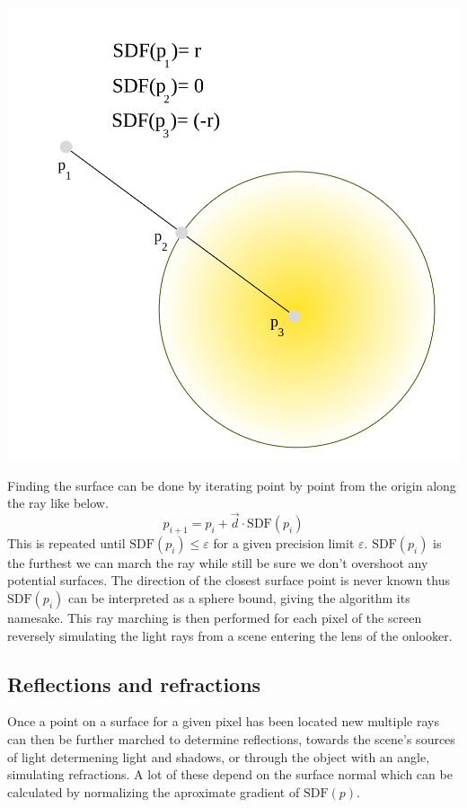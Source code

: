 		\hfill
		\begin{minipage}{0.3\textwidth}
			\includegraphics[width=\linewidth]{figure/SDF} 
		\end{minipage}
		
		\bigskip
		
		Finding the surface can be done by iterating point by point from the
		origin along the ray like below. $$p_{i+1} = p_i + \vec{d}\cdot
		\text{SDF}(p_i)$$ This is repeated until $\text{SDF}(p_i) \leq
		\varepsilon$ for a given precision limit $\varepsilon$.
		$\text{SDF}(p_i)$ is the furthest we can march the ray while still be
		sure we don't overshoot any potential surfaces.  The direction of the
		closest surface point is never known thus $\text{SDF}(p_i)$ can be
		interpreted as a sphere bound, giving the algorithm its namesake. This
		ray marching is then performed for each pixel of the screen reversely
		simulating the light rays from a scene entering the lens of the
		onlooker.
			
			\subsection{Reflections and refractions}
		
				Once a point on a surface for a given pixel has been located
				new multiple rays can then be further marched to determine
				reflections, towards the scene's sources of light determening
				light and shadows, or through the object with an angle,
				simulating refractions. A lot of these depend on the surface
				normal which can be calculated by normalizing the aproximate
				gradient of $\text{SDF}(p)$. 
		
